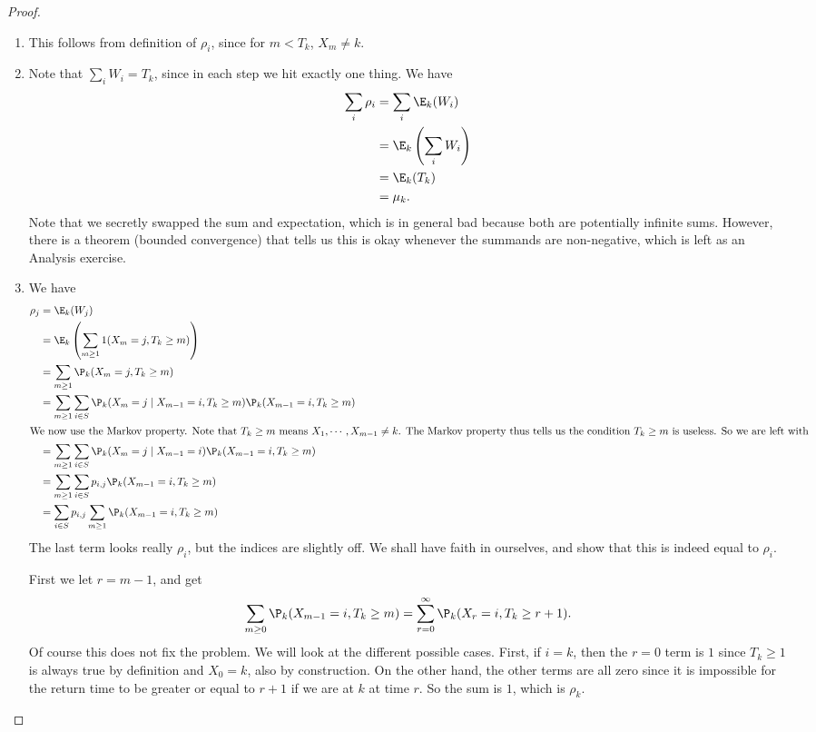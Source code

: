 \documentclass[a4paper]{article}
\begin{document}
\begin{proof}\leavevmode
  \begin{enumerate}
    \item This follows from definition of $\rho_i$, since for $m < T_k$, $X_m \not= k$.
    \item Note that $\sum_i W_i = T_k$, since in each step we hit exactly one thing. We have
      \begin{align*}
        \sum_i \rho_i &= \sum_i \E_k(W_i)\\
        &= \E_k\left(\sum_i W_i\right)\\
        &= \E_k(T_k) \\
        &= \mu_k.
      \end{align*}
      Note that we secretly swapped the sum and expectation, which is in general bad because both are potentially infinite sums. However, there is a theorem (bounded convergence) that tells us this is okay whenever the summands are non-negative, which is left as an Analysis exercise.
    \item We have
      \begin{align*}
        \rho_j &= \E_k(W_j)\\
        &= \E_k\left(\sum_{m \geq 1}1(X_m = j, T_k \geq m)\right) \\
        &= \sum_{m\geq 1}\P_k(X_m = j, T_k \geq m)\\
        &= \sum_{m \geq 1}\sum_{i \in S} \P_k(X_m = j \mid X_{m - 1} = i, T_k \geq m) \P_k(X_{m - 1} = i, T_k \geq m)\\
        \intertext{We now use the Markov property. Note that $T_k \geq m$ means $X_1, \cdots, X_{m - 1} \not= k$. The Markov property thus tells us the condition $T_k \geq m$ is useless. So we are left with}
        &= \sum_{m \geq 1}\sum_{i \in S} \P_k(X_m = j \mid X_{m - 1} = i) \P_k(X_{m - 1} = i, T_k \geq m)\\
        &= \sum_{m \geq 1}\sum_{i \in S} p_{i, j} \P_k(X_{m - 1} = i, T_k \geq m)\\
        &= \sum_{i \in S} p_{i, j} \sum_{m \geq 1} \P_k(X_{m - 1} = i, T_k \geq m)
      \end{align*}
      The last term looks really $\rho_i$, but the indices are slightly off. We shall have faith in ourselves, and show that this is indeed equal to $\rho_i$.

      First we let $r = m - 1$, and get
      \[
        \sum_{m \geq 0} \P_k (X_{m - 1} = i, T_k \geq m) = \sum_{r = 0}^\infty \P_k(X_r = i, T_k \geq r + 1).
      \]
      Of course this does not fix the problem. We will look at the different possible cases. First, if $i = k$, then the $r = 0$ term is $1$ since $T_k \geq 1$ is always true by definition and $X_0 = k$, also by construction. On the other hand, the other terms are all zero since it is impossible for the return time to be greater or equal to $r + 1$ if we are at $k$ at time $r$. So the sum is $1$, which is $\rho_k$.


\end{enumerate}
\end{proof}
\end{document}
